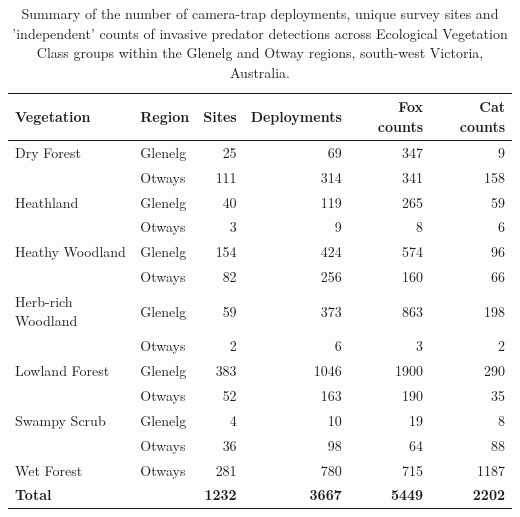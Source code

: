 \documentclass[]{elsarticle} %
\begin{document}
\begin{longtable}[t]{llrrrr}
\caption{\label{tab:diel-tab1}Summary of the number of camera-trap deployments, unique survey sites and 'independent' counts of invasive predator detections across Ecological Vegetation Class groups within the Glenelg and Otway regions, south-west Victoria, Australia.}\\
\toprule
Vegetation & Region & Sites & Deployments & Fox counts & Cat counts\\
\midrule
Dry Forest & Glenelg & 25 & 69 & 347 & 9\\
 & Otways & 111 & 314 & 341 & 158\\
Heathland & Glenelg & 40 & 119 & 265 & 59\\
 & Otways & 3 & 9 & 8 & 6\\
Heathy Woodland & Glenelg & 154 & 424 & 574 & 96\\
\addlinespace
 & Otways & 82 & 256 & 160 & 66\\
Herb-rich Woodland & Glenelg & 59 & 373 & 863 & 198\\
 & Otways & 2 & 6 & 3 & 2\\
Lowland Forest & Glenelg & 383 & 1046 & 1900 & 290\\
 & Otways & 52 & 163 & 190 & 35\\
\addlinespace
Swampy Scrub & Glenelg & 4 & 10 & 19 & 8\\
 & Otways & 36 & 98 & 64 & 88\\
Wet Forest & Otways & 281 & 780 & 715 & 1187\\
\textbf{Total} & \textbf{} & \textbf{1232} & \textbf{3667} & \textbf{5449} & \textbf{2202}\\
\bottomrule
\end{longtable}
\endgroup{}

\newpage

\begingroup\fontsize{10}{12}\selectfont
\end{document}
